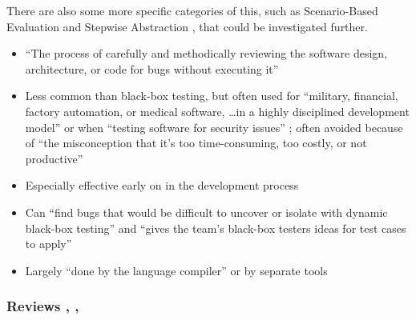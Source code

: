 There are also some more specific
categories of this, such as Scenario-Based
Evaluation \cite[pp.~417-418]{van_vliet_software_2000} and Stepwise Abstraction
\cite[pp.~419-420]{van_vliet_software_2000}, that could be investigated further.

\begin{itemize}
      \item ``The process of carefully and methodically reviewing the software
            design, architecture, or code for bugs without executing it''
            \cite[p.~92]{patton_software_2006}
      \item Less common than black-box testing, but often used for ``military,
            financial, factory automation, or medical software, \dots in a
            highly disciplined development model'' or when ``testing software
            for security issues'' \cite[p.~91]{patton_software_2006}; often
            avoided because of ``the misconception that it's too
            time-consuming, too costly, or not productive''
            \cite[p.~92]{patton_software_2006}
      \item Especially effective early on in the development process
            \cite[p.~92]{patton_software_2006}
      \item Can ``find bugs that would be difficult to uncover or isolate with
            dynamic black-box testing'' and ``gives the team's black-box
            testers ideas for test cases to apply''
            \cite[p.~92]{patton_software_2006}
      \item Largely ``done by the language compiler'' or by separate tools
            \cite[pp.~413-414]{van_vliet_software_2000}
\end{itemize}

\subsubsection{Reviews \cite[pp.~92-95]{patton_software_2006},
      \cite[pp.~415-417]{van_vliet_software_2000},
      \cite[pp.~482-485]{peters_software_2000}}

